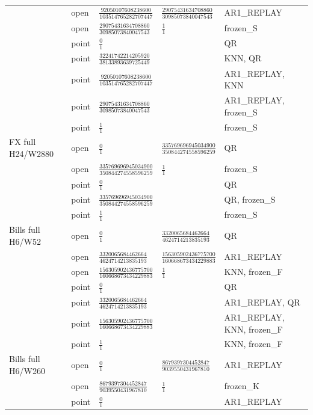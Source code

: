 \documentclass[11pt,a4paper]{article}
\begin{document}
\begin{longtable}{p{28mm}p{10mm}p{39mm}p{39mm}p{28mm}}
 & open & \(\frac{92050107608238600}{103514765282707447}\) & \(\frac{29075431634708860}{30985073840047543}\) & AR1\_REPLAY \\
 & open & \(\frac{29075431634708860}{30985073840047543}\) & \(\frac{1}{1}\) & frozen\_S \\
 & point & \(\frac{0}{1}\) &  & QR \\
 & point & \(\frac{32241742214205920}{38133893639725449}\) &  & KNN, QR \\
 & point & \(\frac{92050107608238600}{103514765282707447}\) &  & AR1\_REPLAY, KNN \\
 & point & \(\frac{29075431634708860}{30985073840047543}\) &  & AR1\_REPLAY, frozen\_S \\
 & point & \(\frac{1}{1}\) &  & frozen\_S \\
FX full H24/W2880 & open & \(\frac{0}{1}\) & \(\frac{335769696945034900}{350844274558596259}\) & QR \\
 & open & \(\frac{335769696945034900}{350844274558596259}\) & \(\frac{1}{1}\) & frozen\_S \\
 & point & \(\frac{0}{1}\) &  & QR \\
 & point & \(\frac{335769696945034900}{350844274558596259}\) &  & QR, frozen\_S \\
 & point & \(\frac{1}{1}\) &  & frozen\_S \\
Bills full H6/W52 & open & \(\frac{0}{1}\) & \(\frac{3320065684462664}{4624714213835193}\) & QR \\
 & open & \(\frac{3320065684462664}{4624714213835193}\) & \(\frac{156305902436775700}{160668673434229883}\) & AR1\_REPLAY \\
 & open & \(\frac{156305902436775700}{160668673434229883}\) & \(\frac{1}{1}\) & KNN, frozen\_F \\
 & point & \(\frac{0}{1}\) &  & QR \\
 & point & \(\frac{3320065684462664}{4624714213835193}\) &  & AR1\_REPLAY, QR \\
 & point & \(\frac{156305902436775700}{160668673434229883}\) &  & AR1\_REPLAY, KNN, frozen\_F \\
 & point & \(\frac{1}{1}\) &  & KNN, frozen\_F \\
Bills full H6/W260 & open & \(\frac{0}{1}\) & \(\frac{8679397304452847}{9039550431967810}\) & AR1\_REPLAY \\
 & open & \(\frac{8679397304452847}{9039550431967810}\) & \(\frac{1}{1}\) & frozen\_K \\
 & point & \(\frac{0}{1}\) &  & AR1\_REPLAY \\

\end{longtable}
\end{document}
